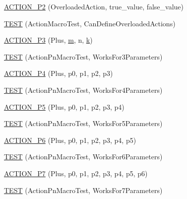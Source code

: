 \begin{DoxyCompactItemize}
\item 
\hyperlink{namespacetesting_1_1gmock__generated__actions__test_a233ee874462c7956e154945975da1127}{A\+C\+T\+I\+O\+N\+\_\+\+P2} (Overloaded\+Action, true\+\_\+value, false\+\_\+value)
\item 
\hyperlink{namespacetesting_1_1gmock__generated__actions__test_a8a3d26365bdae172067fe3a63bd88e85}{T\+E\+ST} (Action\+Macro\+Test, Can\+Define\+Overloaded\+Actions)
\item 
\hyperlink{namespacetesting_1_1gmock__generated__actions__test_a35c62beac532eaff7e54b8ad4a7fe1cf}{A\+C\+T\+I\+O\+N\+\_\+\+P3} (Plus, \hyperlink{variables__e_8js_aab4247b6acebcba996939b177f483c14}{m}, n, \hyperlink{jquery_8js_ab26645c014aa005ecedef329ecf58c99}{k})
\item 
\hyperlink{namespacetesting_1_1gmock__generated__actions__test_a3579cf2428f584d2a837c2c219ec1d5a}{T\+E\+ST} (Action\+Pn\+Macro\+Test, Works\+For3\+Parameters)
\item 
\hyperlink{namespacetesting_1_1gmock__generated__actions__test_ac86e9e1fa5be82823e80247ba093301c}{A\+C\+T\+I\+O\+N\+\_\+\+P4} (Plus, p0, p1, p2, p3)
\item 
\hyperlink{namespacetesting_1_1gmock__generated__actions__test_a6c13e382007960236763d638542bc5fe}{T\+E\+ST} (Action\+Pn\+Macro\+Test, Works\+For4\+Parameters)
\item 
\hyperlink{namespacetesting_1_1gmock__generated__actions__test_a948863fb38d913f02a0c5bde6be0b0a0}{A\+C\+T\+I\+O\+N\+\_\+\+P5} (Plus, p0, p1, p2, p3, p4)
\item 
\hyperlink{namespacetesting_1_1gmock__generated__actions__test_a132cab07373e037a06807a5948b1410b}{T\+E\+ST} (Action\+Pn\+Macro\+Test, Works\+For5\+Parameters)
\item 
\hyperlink{namespacetesting_1_1gmock__generated__actions__test_a97cbcc90a3063a1882886ded61fc8979}{A\+C\+T\+I\+O\+N\+\_\+\+P6} (Plus, p0, p1, p2, p3, p4, p5)
\item 
\hyperlink{namespacetesting_1_1gmock__generated__actions__test_a9031cb5f0e3d9de21ed3ff0a98a311d4}{T\+E\+ST} (Action\+Pn\+Macro\+Test, Works\+For6\+Parameters)
\item 
\hyperlink{namespacetesting_1_1gmock__generated__actions__test_a58bc376a0637fc1e89e6503466d1b9cd}{A\+C\+T\+I\+O\+N\+\_\+\+P7} (Plus, p0, p1, p2, p3, p4, p5, p6)
\item 
\hyperlink{namespacetesting_1_1gmock__generated__actions__test_add3cba52186c7ce384808c222492ee18}{T\+E\+ST} (Action\+Pn\+Macro\+Test, Works\+For7\+Parameters)
\item 

\end{DoxyCompactItemize}
